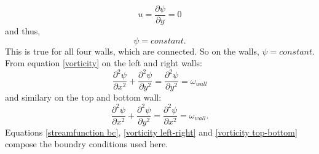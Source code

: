 \documentclass{article}
\begin{document}
\begin{equation}
	u = \frac{\partial \psi}{\partial y} = 0
\end{equation}
and thus,
\begin{equation}
	\psi = constant.
	\label{streamfunction bc}
\end{equation}
This is true for all four walls, which are connected. So on the walls, $\psi = constant$.
From equation \ref{vorticity} on the left and right walls:
\begin{equation}
	\frac{\partial^2 \psi}{\partial x^2} + \frac{\partial^2 \psi}{\partial y^2} = \frac{\partial^2 \psi}{\partial y^2}= \omega_{wall}
	\label{vorticity left-right}
\end{equation}
and similary on the top and bottom wall:
\begin{equation}
	\frac{\partial^2 \psi}{\partial x^2} + \frac{\partial^2 \psi}{\partial y^2} = \frac{\partial^2 \psi}{\partial x^2}= \omega_{wall}.
	\label{vorticity top-bottom}
\end{equation}
Equations \ref{streamfunction bc}, \ref{vorticity left-right} and \ref{vorticity top-bottom} compose the boundry conditions used here.
\end{document}
